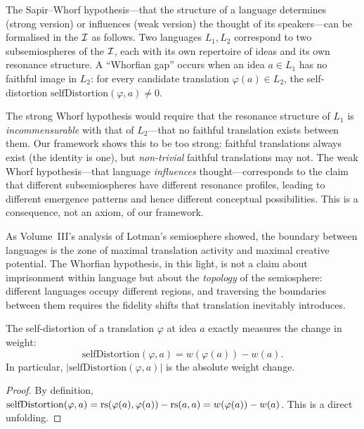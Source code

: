 \begin{remark}
\label{rem:whorfian-formal}
The Sapir--Whorf hypothesis---that the structure of a language determines (strong version) or influences (weak version) the thought of its speakers---can be formalised in the $\mathcal{I}$ as follows.  Two languages $L_1, L_2$ correspond to two subsemiospheres of the $\mathcal{I}$, each with its own repertoire of ideas and its own resonance structure.  A ``Whorfian gap'' occurs when an idea $a \in L_1$ has no faithful image in $L_2$: for every candidate translation $\varphi(a) \in L_2$, the self-distortion $\mathrm{selfDistortion}(\varphi, a) \neq 0$.  

The strong Whorf hypothesis would require that the resonance structure of $L_1$ is \emph{incommensurable} with that of $L_2$---that no faithful translation exists between them.  Our framework shows this to be too strong: faithful translations always exist (the identity is one), but \emph{non-trivial} faithful translations may not.  The weak Whorf hypothesis---that language \emph{influences} thought---corresponds to the claim that different subsemiospheres have different resonance profiles, leading to different emergence patterns and hence different conceptual possibilities.  This is a consequence, not an axiom, of our framework.

As Volume~III's analysis of Lotman's semiosphere showed, the boundary between languages is the zone of maximal translation activity and maximal creative potential.  The Whorfian hypothesis, in this light, is not a claim about imprisonment within language but about the \emph{topology} of the semiosphere: different languages occupy different regions, and traversing the boundaries between them requires the fidelity shifts that translation inevitably introduces.
\end{remark}

\begin{theorem}
\label{thm:self-distortion-weight}
The self-distortion of a translation $\varphi$ at idea $a$ exactly measures the change in weight:
\[
  \mathrm{selfDistortion}(\varphi, a) = w(\varphi(a)) - w(a).
\]
In particular, $|\mathrm{selfDistortion}(\varphi, a)|$ is the absolute weight change.
\end{theorem}

\begin{proof}
By definition, $\mathrm{selfDistortion}(\varphi, a) = \mathrm{rs}(\varphi(a), \varphi(a)) - \mathrm{rs}(a, a) = w(\varphi(a)) - w(a)$.  This is a direct unfolding.
\end{proof}


